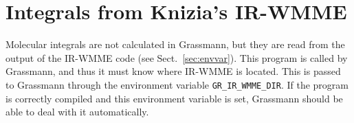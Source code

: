 \section{Integrals from Knizia's IR-WMME}
\label{sec:irwmme}

Molecular integrals are not calculated in Grassmann,
but they are read from the output of the IR-WMME code (see Sect.~\ref{sec:envvar}).
This program is called by Grassmann, and thus it must know where IR-WMME is located.
This is passed to Grassmann through the environment variable \verb+GR_IR_WMME_DIR+.
If the program is correctly compiled and this environment variable is set,
Grassmann should be able to deal with it automatically.



